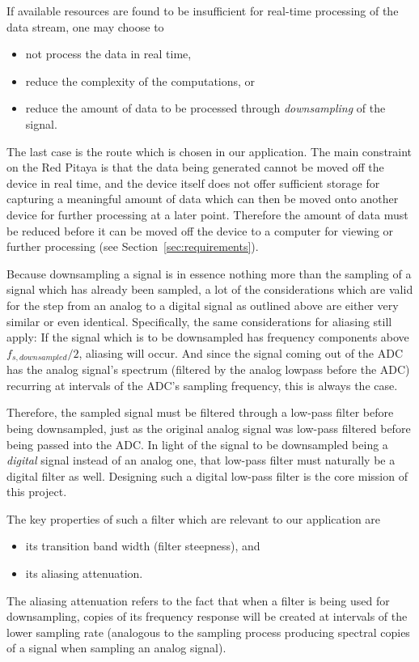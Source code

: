 If available resources are found to be insufficient for real-time processing of
the data stream, one may choose to
\begin{itemize}\tightlist
    \item
        not process the data in real time,
    \item
        reduce the complexity of the computations, or
    \item
        reduce the amount of data to be processed through \emph{downsampling}
        of the signal.
\end{itemize}
The  last case  is the  route  which is  chosen in  our application. The  main
constraint on the Red Pitaya is that  the data being generated cannot be moved
off the device in  real time, and the device itself  does not offer sufficient
storage for capturing a meaningful amount of data which can then be moved onto
another device for  further processing at a later  point. Therefore the amount
of data must  be reduced before it can  be moved off the device  to a computer
for viewing or further processing (see Section~\ref{sec:requirements}).

Because downsampling a signal is in  essence nothing more than the sampling of
a signal which has already been sampled, a lot of the considerations which are
valid for the  step from an analog  to a digital signal as  outlined above are
either very  similar or even identical. Specifically,  the same considerations
for  aliasing still  apply: If  the  signal which  is  to  be downsampled  has
frequency components  above $f_{s,  downsampled}/2$, aliasing  will occur. And
since  the signal  coming out  of  the ADC  has the  analog signal's  spectrum
(filtered by the analog lowpass before  the ADC) recurring at intervals of the
ADC's sampling frequency, this is always the case.

Therefore,  the sampled  signal must  be  filtered through  a low-pass  filter
before  being downsampled,  just as  the original  analog signal  was low-pass
filtered  before being  passed into  the  ADC. In light  of the  signal to  be
downsampled  being a  \emph{digital} signal  instead  of an  analog one,  that
low-pass filter must  naturally be a digital filter as  well. Designing such a
digital low-pass filter is the core mission of this project.

The key properties of such a filter which are relevant to our application are
\begin{itemize}\tightlist
    \item
        its transition band width (filter steepness), and
    \item
        its aliasing attenuation.
\end{itemize}
The aliasing attenuation refers  to the fact that when a  filter is being used
for  downsampling,  copies  of  its  frequency response  will  be  created  at
intervals  of the  lower  sampling  rate (analogous  to  the sampling  process
producing spectral copies of a signal when sampling an analog signal).

